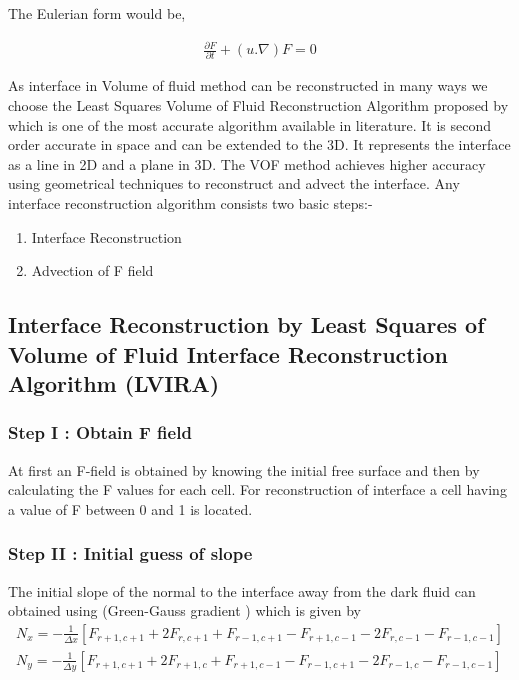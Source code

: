 The Eulerian form would be,

\begin{eqnarray}
 \frac{\partial F}{\partial t}+( u. \nabla)F=0
 \label{Eq:advection_vof}
\end{eqnarray}



As interface in Volume of fluid method can be reconstructed in many ways we choose the Least Squares Volume of 
Fluid Reconstruction Algorithm proposed by \cite{Pilliod2004} which is one of the most accurate algorithm available in literature. It is second order accurate in space 
and can be extended to the 3D. It represents the interface as a line in 2D and a plane in 3D. The VOF method achieves higher accuracy using geometrical techniques to reconstruct
and advect the interface.
Any interface reconstruction algorithm consists two basic steps:-
\begin{enumerate}
 \item Interface Reconstruction
 \item Advection of F field
\end{enumerate}
\pagebreak

\subsection{Interface Reconstruction by Least Squares of Volume of Fluid Interface Reconstruction Algorithm (LVIRA)}
\subsubsection{Step I : Obtain F field}
At first an F-field is obtained by knowing the initial free surface and then by calculating the F values for each cell. 
For reconstruction of interface a cell having a value of F between 0 and 1 is located.

\subsubsection{Step II : Initial guess of slope}
The initial slope of the normal to the interface away from the dark fluid can obtained using (Green-Gauss gradient \cite{Gerlach2006}) which is  given by 
\begin{eqnarray}
  N_x=-\frac{1}{\Delta x}{[F_{r+1,c+1}+2F_{r,c+1}+F_{r-1,c+1}-F_{r+1,c-1}-2F_{r,c-1}-F_{r-1,c-1}]} \\
  N_y=-\frac{1}{\Delta y}{[F_{r+1,c+1}+2F_{r+1,c}+F_{r+1,c-1}-F_{r-1,c+1}-2F_{r-1,c}-F_{r-1,c-1}]}
  \label{Eq:GG}
\end{eqnarray}

